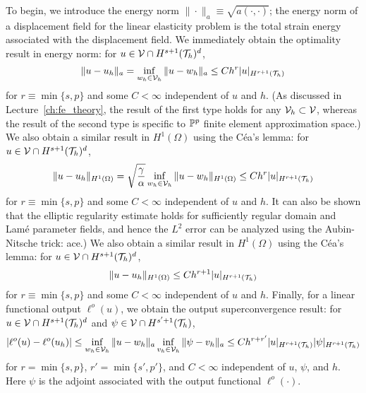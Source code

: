 To begin, we introduce the energy norm $\| \cdot \|_a \equiv \sqrt{a(\cdot,\cdot)}$; the energy norm of a displacement field for the linear elasticity problem is the total strain energy associated with the displacement field. We immediately obtain the optimality result in energy norm: for $u \in \mathcal{V} \cap H^{s+1}(\mathcal{T}_h)^d$, 
\begin{equation*}
  \| u - u_h \|_a = \inf_{w_h \in \mathcal{V}_h} \| u - w_h \|_a
  \leq C h^{r} | u |_{H^{r+1}(\mathcal{T}_h)}
\end{equation*}
for $r \equiv \min \{s, p \}$ and some $C < \infty$ independent of $u$ and $h$. (As discussed in Lecture~\ref{ch:fe_theory}, the result of the first type holds for any $\mathcal{V}_h \subset \mathcal{V}$, whereas the result of the second type is specific to $\mathbb{P}^p$ finite element approximation space.) We also obtain a similar result in $H^1(\Omega)$ using the C\'ea's lemma: for $u \in \mathcal{V} \cap H^{s+1}(\mathcal{T}_h)^d$, 
\begin{equation*}
  \| u - u_h \|_{H^1(\Omega)} = \sqrt{\frac{\gamma}{\alpha}} \inf_{w_h \in \mathcal{V}_h} \| u - w_h \|_{H^1(\Omega)}
  \leq C h^{r} | u |_{H^{r+1}(\mathcal{T}_h)}
\end{equation*}
for $r \equiv \min \{s, p \}$ and some $C < \infty$ independent of $u$ and $h$.  It can also be shown that the elliptic regularity estimate holds for sufficiently regular domain and Lam\'e parameter fields, and hence the $L^2$ error can be analyzed using the Aubin-Nitsche trick: ace.) We also obtain a similar result in $H^1(\Omega)$ using the C\'ea's lemma: for $u \in \mathcal{V} \cap H^{s+1}(\mathcal{T}_h)^d$, 
\begin{equation*}
  \| u - u_h \|_{H^1(\Omega)} \leq C h^{r+1} | u |_{H^{r+1}(\mathcal{T}_h)}
\end{equation*}
for $r \equiv \min \{s, p \}$ and some $C < \infty$ independent of $u$ and $h$. Finally, for a linear functional output $\ell^o(u)$, we obtain the output superconvergence result: for $u \in \mathcal{V} \cap H^{s+1}(\mathcal{T}_h)^d$ and $\psi \in \mathcal{V} \cap H^{s'+1}(\mathcal{T}_h)$,
\begin{equation*}
  | \ell^o(u) - \ell^o(u_h) |
  \leq \inf_{w_h \in \mathcal{V}_h} \| u - w_h \|_a \inf_{v_h \in \mathcal{V}_h} \| \psi - v_h \|_a \leq C h^{r + r'} | u |_{H^{r+1}(\mathcal{T}_h)} | \psi |_{H^{r+1}(\mathcal{T}_h)}
\end{equation*}
for $r = \min\{ s,p \}$, $r' = \min\{s',p'\}$, and $C < \infty$ independent of $u$, $\psi$, and $h$.  Here $\psi$ is the adjoint associated with the output functional $\ell^o(\cdot)$.

